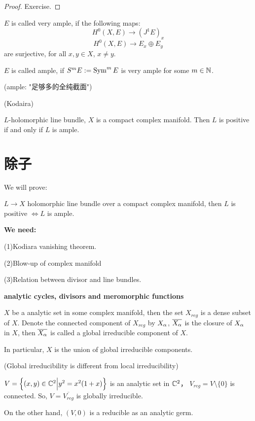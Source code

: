 \begin{proof}
  Exercise.
\end{proof}

\begin{definition}
$E$ is called very ample, if the following maps:
$$H^0(X,E)\to (J^1E)_x$$
$$H^0(X,E)\to E_x\oplus E_y$$
are surjective, for all $x,y\in X$, $x\neq y$.

$E$ is called ample, if $S^mE:=\operatorname{Sym}^m E$ is very ample for some $m\in\mathbb{N}$.
\end{definition}

(ample: "足够多的全纯截面")

\begin{thm}(Kodaira)

$L$-holomorphic line bundle, $X$ is a compact complex manifold.
Then $L$ is positive if and only if $L$ is ample.
\end{thm}


\section{除子}

We will prove:

\begin{thm}
$L\to X$ holomorphic line bundle over a compact complex manifold,
then $L$ is positive $\iff L$ is ample.
\end{thm}

\textbf{We need:}

(1)Kodiara vanishing theorem.

(2)Blow-up of complex manifold

(3)Relation between divisor and line bundles.

\textbf{analytic cycles, divisors and meromorphic functions}

\begin{definition}
$X$ be a analytic set in some complex manifold, then the set
$X_{reg}$ is a dense subset of $X$.
Denote the connected component of $X_{reg}$ by $X_\alpha$,
$\overline{X_\alpha}$ is the closure of $X_\alpha$ in $X$,
then $\overline{X_\alpha}$ is called a global irreducible component of $X$.

In particular, $X$ is the union of global irreducible components.
\end{definition}

\begin{example}(Global irreducibility is different from local irreducibility)

$V=\Big\{ (x,y)\in\mathbb{C}^2 \Big| y^2=x^2(1+x) \Big\}$ is an analytic set in $\mathbb{C}^2$，
$V_{reg}=V\setminus\{0\}$ is connected. So,
$V=\overline{V_{reg}}$ is globally irreducible.

On the other hand, $(V,0)$ is a reducible as an analytic germ.
\end{example}

